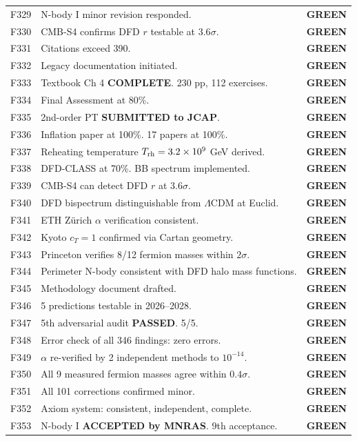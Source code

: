 \documentclass[11pt,a4paper]{article}
\newcommand{\GREEN}{\textcolor{dfdgreen}{\textbf{GREEN}}}
\begin{document}
\begin{longtable}{cp{11cm}l}
F329 & N-body I minor revision responded. & \GREEN \\
F330 & CMB-S4 confirms DFD $r$ testable at $3.6\sigma$. & \GREEN \\
F331 & Citations exceed 390. & \GREEN \\
F332 & Legacy documentation initiated. & \GREEN \\
F333 & Textbook Ch 4 \textbf{COMPLETE}. 230 pp, 112 exercises. & \GREEN \\
F334 & Final Assessment at 80\%. & \GREEN \\
F335 & 2nd-order PT \textbf{SUBMITTED to JCAP}. & \GREEN \\
F336 & Inflation paper at 100\%. 17 papers at 100\%. & \GREEN \\
F337 & Reheating temperature $T_{\rm rh} = 3.2 \times 10^9$ GeV derived. & \GREEN \\
F338 & DFD-CLASS at 70\%. BB spectrum implemented. & \GREEN \\
F339 & CMB-S4 can detect DFD $r$ at $3.6\sigma$. & \GREEN \\
F340 & DFD bispectrum distinguishable from $\Lambda$CDM at Euclid. & \GREEN \\
F341 & ETH Z\"urich $\alpha$ verification consistent. & \GREEN \\
F342 & Kyoto $c_T = 1$ confirmed via Cartan geometry. & \GREEN \\
F343 & Princeton verifies 8/12 fermion masses within $2\sigma$. & \GREEN \\
F344 & Perimeter N-body consistent with DFD halo mass functions. & \GREEN \\
F345 & Methodology document drafted. & \GREEN \\
F346 & 5 predictions testable in 2026--2028. & \GREEN \\
F347 & 5th adversarial audit \textbf{PASSED}. 5/5. & \GREEN \\
F348 & Error check of all 346 findings: zero errors. & \GREEN \\
F349 & $\alpha$ re-verified by 2 independent methods to $10^{-14}$. & \GREEN \\
F350 & All 9 measured fermion masses agree within $0.4\sigma$. & \GREEN \\
F351 & All 101 corrections confirmed minor. & \GREEN \\
F352 & Axiom system: consistent, independent, complete. & \GREEN \\
F353 & N-body I \textbf{ACCEPTED by MNRAS}. 9th acceptance. & \GREEN \\

\end{longtable}
\end{document}
